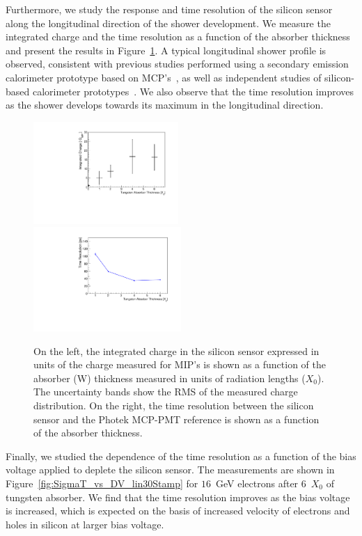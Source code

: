 \documentclass[12pt]{article}
\begin{document}
{Furthermore, we study the response and time resolution of the silicon sensor
along the longitudinal direction of the shower development. We measure the
integrated charge and the time resolution as a function of the absorber
thickness and present the results in Figure~\ref{fig:MIPVsAbsorberAt8GeV}. A
typical longitudinal shower profile is observed, consistent with previous
studies performed using a secondary emission calorimeter prototype based on
MCP's~\cite{MCPShowerMaxPaper}, as well as independent studies of silicon-based
calorimeter prototypes~\cite{Muhuri201424}. We also observe that the time
resolution improves as the shower develops towards its maximum in the
longitudinal direction. 

\begin{figure}[htbp] 
\centering
\includegraphics[width=0.49\textwidth]{plots/MIPVsAbsorberAt8GeV.pdf} 
\includegraphics[width=0.5\textwidth]{plots/SigmaT_vs_X0_lin30Stamp.pdf} 
\caption{On the left, the integrated charge in the silicon sensor expressed in units of the 
charge measured for MIP's is shown as a function of the absorber (W) thickness measured in
units of radiation lengths ($X_{0}$). The uncertainty bands show the RMS of the measured charge 
distribution. On the right, the time resolution between the silicon 
sensor and the Photek MCP-PMT reference is shown as a function of the 
absorber thickness.
} 
\label{fig:MIPVsAbsorberAt8GeV} 
\end{figure} 

Finally, we studied the dependence of the time resolution as a function of the
bias voltage applied to deplete the silicon sensor. The measurements are shown
in Figure~\ref{fig:SigmaT_vs_DV_lin30Stamp} for $16$~GeV electrons after
6~$X_0$ of tungsten absorber. We find that the time resolution
improves as the bias voltage is increased, which is expected on the basis of 
increased velocity of electrons and holes in silicon at larger bias voltage. 

}
\end{document}
